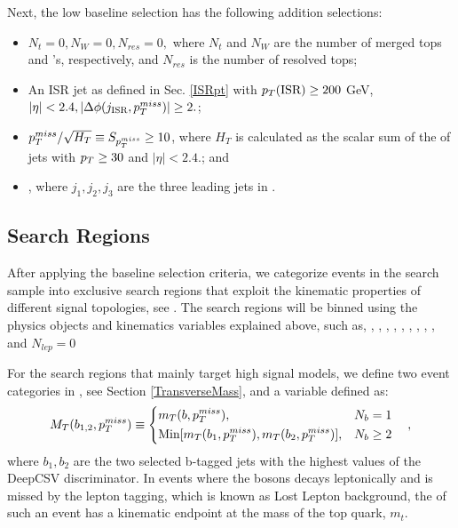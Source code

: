 Next, the low \dm{} baseline selection has the following addition selections:
\begin{itemize}
	\item $N_t=0, N_W=0,N_{res}=0,$ where $N_t$ and $N_W$ are the number of merged tops and \W's, respectively, and $N_{res}$ is the number of resolved tops;
	\item An ISR jet as defined in Sec. \ref{ISRpt} with $p_{T}(\text{ISR})\geq200$ GeV, $|\eta|<2.4, |\Delta\phi(j_{\text{ISR}},p_{T}^{miss})|\geq2.$;
	\item $p_{T}^{miss}/\sqrt{H_{T}}\equiv S_{p_{T}^{miss}}\geq10$, where $H_T$ is calculated as the scalar sum of the \pt{} of jets with $p_{T}\geq30$ \GeV{} and $|\eta|<2.4.$; and
	\item \lowdm, where $j_1,j_2,j_3$ are the three leading jets in \pt. 
\end{itemize}

\subsection{Search Regions}\label{SearchRegions}

After applying the baseline selection criteria, we categorize events in the search sample into exclusive search regions that exploit the kinematic properties of different signal topologies, see \cite{cms_collaboration_search_2016, alwall_simplified_2009, alwall_model-independent_2009}. The search regions will be binned using the physics objects and kinematics variables explained above, such as, \nj, \nb, \nt, \nrt, \nw, \met, \Ht, \nsv, \mtb, and $N_{lep}=0$

For the search regions that mainly target high \dm{} signal models, we define two event categories in \mtb, see Section \ref{TransverseMass}, and a variable defined as:
\begin{equation}
M_{T}(b_{1,2},p_{T}^{miss})\equiv
\begin{cases}
\begin{split}
& m_T(b,p_{T}^{miss}), &N_{b}=1 \\
& \text{Min}[m_T(b_1, p_{T}^{miss}),m_T(b_2,p_{T}^{miss})], &N_{b}\geq2 \\
\end{split}
\end{cases},
\end{equation}
where $b_1, b_2$ are the two selected b-tagged jets with the highest values of the DeepCSV discriminator. In \ttbar{} events where the \W{} bosons decays leptonically and is missed by the lepton tagging, which is known as Lost Lepton background, the \mtb of such an event has a kinematic endpoint at the mass of the top quark, $m_t$.

